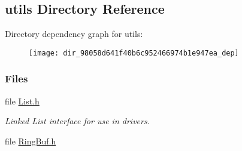 \subsection{utils Directory Reference}
\label{dir_98058d641f40b6c952466974b1e947ea}
Directory dependency graph for utils\+:
\nopagebreak
\begin{figure}[H]
\begin{center}
\leavevmode
\texttt{[image: dir\_98058d641f40b6c952466974b1e947ea\_dep]}
\end{center}
\end{figure}
\subsubsection*{Files}
\begin{DoxyCompactItemize}
\item 
file \hyperlink{_list_8h}{List.\+h}
\begin{DoxyCompactList}\small\item\em Linked List interface for use in drivers. \end{DoxyCompactList}\item 
file \hyperlink{_ring_buf_8h}{Ring\+Buf.\+h}
\end{DoxyCompactItemize}
